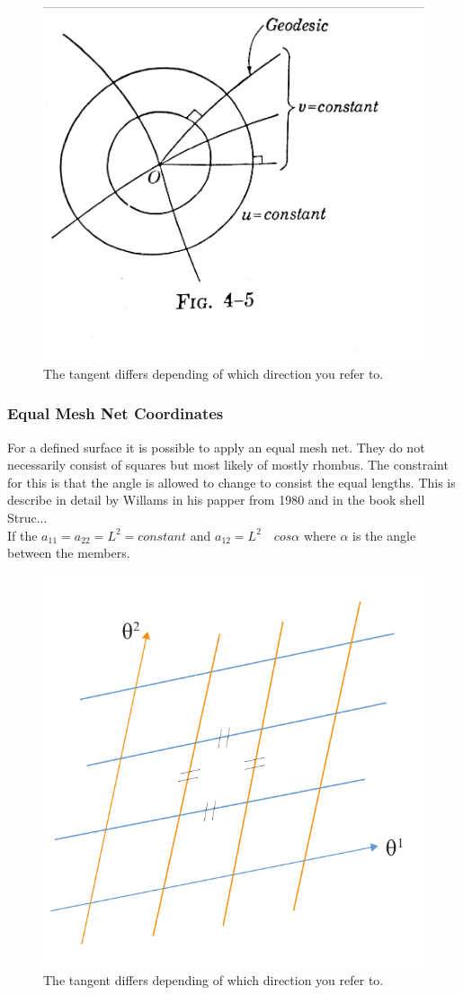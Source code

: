 \begin{figure}[H]
\centering
\includegraphics[height=0.5\linewidth ]{figure/Theory/polarGeodesicCoordMod.pdf}
\caption{The tangent differs depending of which direction you refer to. }
\end{figure}


\subsubsection{Equal Mesh Net Coordinates}

For a defined surface it is possible to apply an equal mesh net. They do not necessarily consist of squares but most likely of mostly rhombus. The constraint for this is that the angle is allowed to change to consist the equal lengths. This is describe in detail by Willams in his papper from 1980 and in the book shell Struc...\\
If the $a_{11} = a_{22} = L^2 = constant$ and $a_{12} = L^2\quad cos\alpha$ where $\alpha$ is the angle between the members.\\

\begin{figure}[H]
\centering
\includegraphics[width=0.6\linewidth ]{figure/Theory/equalMeshFrei.pdf}
\caption{The tangent differs depending of which direction you refer to. }
\end{figure}

